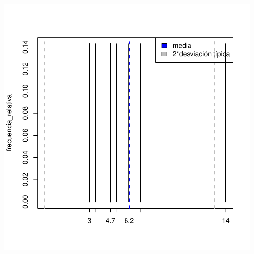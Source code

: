 \documentclass [a4paper] {article}
\begin{document}
\begin{center}
\begin{Schunk}
\end{Schunk}
\includegraphics{entrega-desviacion_tipica_resistencia}
\end{center}
\end{document}
